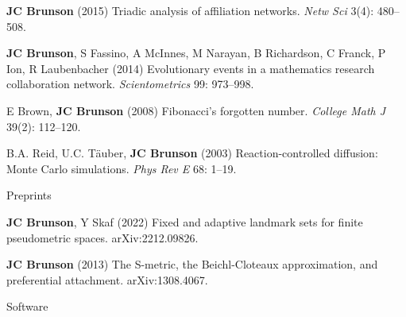 \documentclass[10pt,a4paper]{article}
\begin{document}
\begin{enumerate}[label={[\arabic*]},labelindent=1cm,nolistsep]
\item
{\bfseries JC Brunson} (2015) Triadic analysis of affiliation networks. {\itshape Netw Sci} 3(4): 480--508.
\item
{\bfseries JC Brunson}, S Fassino, A McInnes, M Narayan, B Richardson, C Franck, P Ion, R Laubenbacher (2014) Evolutionary events in a mathematics research collaboration network. {\itshape Scientometrics} 99: 973--998.
\item
E Brown, {\bfseries JC Brunson} (2008) Fibonacci's forgotten number. {\itshape College Math J} 39(2): 112--120.
\item
B.A. Reid, U.C. T\"{a}uber, {\bfseries JC Brunson} (2003) Reaction-controlled diffusion: Monte Carlo simulations. {\itshape Phys Rev E} 68: 1--19.
\setcounter{paper}{\value{enumi}}
\end{enumerate}
%
\vspace{.25cm}
{\sc Preprints}
\begin{enumerate}[label={[\arabic*]},labelindent=1cm,nolistsep]
\setcounter{enumi}{\value{paper}}
\item
{\bfseries JC Brunson}, Y Skaf (2022) Fixed and adaptive landmark sets for finite pseudometric spaces. arXiv:2212.09826.
\item
{\bfseries JC Brunson} (2013) The S-metric, the Beichl-Cloteaux approximation, and preferential attachment. arXiv:1308.4067.
\setcounter{paper}{\value{enumi}}
\end{enumerate}
%
\vspace{.25cm}
{\sc Software}
\end{document}
